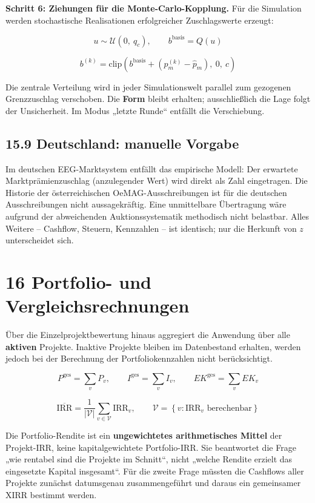 \documentclass[
  a4paper,
  10pt]{article}
\renewenvironment{quote}
  {\begin{tcolorbox}[
      enhanced,
      breakable,
      colback=Wash,
      colframe=Brand,
      boxrule=0pt,
      leftrule=2.2pt,
      arc=0pt,
      left=8pt,right=8pt,top=6pt,bottom=6pt,
      before skip=8pt,after skip=9pt
    ]\small\color{InkSoft}}
  {\end{tcolorbox}}
\begin{document}
\textbf{Schritt 6: Ziehungen für die Monte-Carlo-Kopplung.} Für die
Simulation werden stochastische Realisationen erfolgreicher
Zuschlagswerte erzeugt:

\[ u \sim \mathcal{U}(0,\ q_c), \qquad b^{\mathrm{basis}} = Q(u) \]

\[ b^{(k)} = \mathrm{clip}\left(b^{\mathrm{basis}} + \left(p_m^{(k)} - \hat{p}_m\right),\ 0,\ c\right) \]

Die zentrale Verteilung wird in jeder Simulationswelt parallel zum
gezogenen Grenzzuschlag verschoben. Die \textbf{Form} bleibt erhalten;
ausschließlich die Lage folgt der Unsicherheit. Im Modus „letzte Runde``
entfällt die Verschiebung.

\hypertarget{deutschland-manuelle-vorgabe}{%
\subsection{15.9 Deutschland: manuelle
Vorgabe}\label{deutschland-manuelle-vorgabe}}

Im deutschen EEG-Marktsystem entfällt das empirische Modell: Der
erwartete Marktprämienzuschlag (anzulegender Wert) wird direkt als Zahl
eingetragen. Die Historie der österreichischen OeMAG-Ausschreibungen ist
für die deutschen Ausschreibungen nicht aussagekräftig. Eine
unmittelbare Übertragung wäre aufgrund der abweichenden
Auktionssystematik methodisch nicht belastbar. Alles Weitere --
Cashflow, Steuern, Kennzahlen -- ist identisch; nur die Herkunft von
\(z\) unterscheidet sich.

\hypertarget{portfolio--und-vergleichsrechnungen}{%
\section{16 Portfolio- und
Vergleichsrechnungen}\label{portfolio--und-vergleichsrechnungen}}

Über die Einzelprojektbewertung hinaus aggregiert die Anwendung über
alle \textbf{aktiven} Projekte. Inaktive Projekte bleiben im
Datenbestand erhalten, werden jedoch bei der Berechnung der
Portfoliokennzahlen nicht berücksichtigt.

\[ P^{\mathrm{ges}} = \sum_{v} P_v, \qquad I^{\mathrm{ges}} = \sum_{v} I_v, \qquad EK^{\mathrm{ges}} = \sum_{v} EK_v \]

\[ \overline{\mathrm{IRR}} = \frac{1}{\left|\mathcal{V}\right|}\sum_{v \in \mathcal{V}} \mathrm{IRR}_v, \qquad \mathcal{V} = \left\{v : \mathrm{IRR}_v \text{ berechenbar}\right\} \]

\begin{quote}
Die Portfolio-Rendite ist ein \textbf{ungewichtetes arithmetisches
Mittel} der Projekt-IRR, keine kapitalgewichtete Portfolio-IRR. Sie
beantwortet die Frage „wie rentabel sind die Projekte im Schnitt``,
nicht „welche Rendite erzielt das eingesetzte Kapital insgesamt``. Für
die zweite Frage müssten die Cashflows aller Projekte zunächst
datumsgenau zusammengeführt und daraus ein gemeinsamer XIRR bestimmt
werden.
\end{quote}
\end{document}
